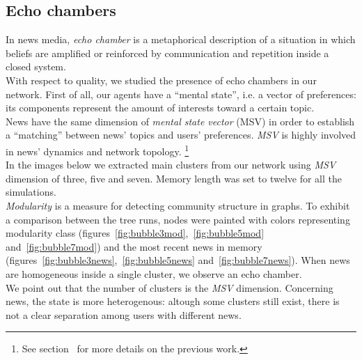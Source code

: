 \subsection{Echo chambers}
In news media, \textit{echo chamber} is a metaphorical description
of a situation in which beliefs are amplified or reinforced by
communication and repetition inside a closed
system.\cite{echochamwiki,echocham}\\
With respect to quality, we studied the presence of echo chambers
in our network.
First of all, our agents have a ``mental  state'', i.e. a vector of
preferences: its components represent the amount of interests toward
a certain topic.\\
News have the same dimension of \textit{mental state vector} (MSV)
in order to establish a ``matching'' between news' topics and users'
preferences.
\textit{MSV} is highly involved in news' dynamics and network
topology.
\footnote{See section~ for more
  details on the previous work.}\\
In the images below we extracted main clusters from our network using
\textit{MSV} dimension of three, five and seven.
Memory length was set to twelve for all the simulations.\\
\textit{Modularity} is a measure for detecting community
structure in graphs.\cite{modulwiki}
To exhibit a comparison between the tree runs,
nodes were painted with colors representing modularity class
(figures~\ref{fig:bubble3mod},~\ref{fig:bubble5mod} and~\ref{fig:bubble7mod})
and the most recent news in memory
(figures~\ref{fig:bubble3news},~\ref{fig:bubble5news} and~\ref{fig:bubble7news}).
When news are homogeneous inside a single cluster, we observe
an echo chamber.\\
We point out that the number of clusters is the \textit{MSV} dimension.
Concerning news, the state is more heterogenous:
altough some clusters still exist, there is not a clear separation
among users with different news.
%
